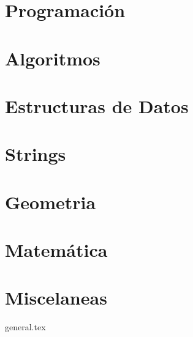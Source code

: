 \documentclass{article}
\begin{document}
\tableofcontents

\pagebreak

\section{Programación}

\pagebreak

\pagebreak

\section{Algoritmos}

\pagebreak

\section{Estructuras de Datos}

\pagebreak

\section{Strings}

\pagebreak

\section{Geometria}

\pagebreak

\section{Matemática}

\pagebreak

\pagebreak

\pagebreak
%

\section{Miscelaneas}
{general.tex}
\pagebreak
\end{document}
